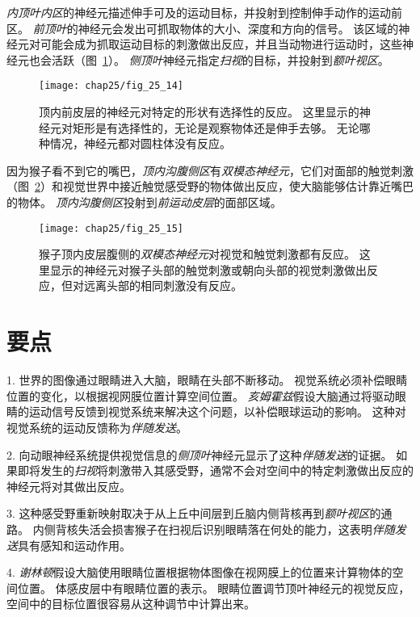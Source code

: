 \textit{内顶叶内区}的神经元描述伸手可及的运动目标，并投射到控制伸手动作的运动前区。
\textit{前顶叶}的神经元会发出可抓取物体的大小、深度和方向的信号。
该区域的神经元对可能会成为抓取运动目标的刺激做出反应，并且当动物进行运动时，这些神经元也会活跃（图~\ref{fig:25_14}）。
\textit{侧顶叶}神经元指定\textit{扫视}的目标，并投射到\textit{额叶视区}。


\begin{figure}[htbp]
	\centering
	\texttt{[image: chap25/fig\_25\_14]}
	\caption{顶内前皮层的神经元对特定的形状有选择性的反应。
		这里显示的神经元对矩形是有选择性的，无论是观察物体还是伸手去够。
		无论哪种情况，神经元都对圆柱体没有反应。}
	\label{fig:25_14}
\end{figure}


因为猴子看不到它的嘴巴，\textit{顶内沟腹侧区}有\textit{双模态神经元}，它们对面部的触觉刺激（图~\ref{fig:25_15}）和视觉世界中接近触觉感受野的物体做出反应，使大脑能够估计靠近嘴巴的物体。
\textit{顶内沟腹侧区}投射到\textit{前运动皮层}的面部区域。


\begin{figure}[htbp]
	\centering
	\texttt{[image: chap25/fig\_25\_15]}
	\caption{猴子顶内皮层腹侧的\textit{双模态神经元}对视觉和触觉刺激都有反应。
		这里显示的神经元对猴子头部的触觉刺激或朝向头部的视觉刺激做出反应，但对远离头部的相同刺激没有反应。}
	\label{fig:25_15}
\end{figure}



\section{要点}

1. 世界的图像通过眼睛进入大脑，眼睛在头部不断移动。
视觉系统必须补偿眼睛位置的变化，以根据视网膜位置计算空间位置。
\textit{亥姆霍兹}假设大脑通过将驱动眼睛的运动信号反馈到视觉系统来解决这个问题，以补偿眼球运动的影响。
这种对视觉系统的运动反馈称为\textit{伴随发送}。


2. 向动眼神经系统提供视觉信息的\textit{侧顶叶}神经元显示了这种\textit{伴随发送}的证据。
如果即将发生的\textit{扫视}将刺激带入其感受野，通常不会对空间中的特定刺激做出反应的神经元将对其做出反应。


3. 这种感受野重新映射取决于从上丘中间层到丘脑内侧背核再到\textit{额叶视区}的通路。
内侧背核失活会损害猴子在扫视后识别眼睛落在何处的能力，这表明\textit{伴随发送}具有感知和运动作用。


4. \textit{谢林顿}假设大脑使用眼睛位置根据物体图像在视网膜上的位置来计算物体的空间位置。
体感皮层中有眼睛位置的表示。
眼睛位置调节顶叶神经元的视觉反应，空间中的目标位置很容易从这种调节中计算出来。


